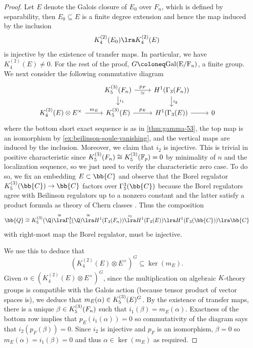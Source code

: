 \documentclass[a4paper]{amsart}
\begin{document}
\begin{proof}
Let $E$ denote the Galois closure of $E_0$ over $F_n$, which is defined by separability, then $E_0 \subseteq E$ is a finite degree extension and hence the map induced by the inclusion
\[K_4^{(2)}(E_0) \lra K_4^{(2)}(E)\]
is injective by the existence of transfer maps. In particular, we have $K_4^{(2)}(E) \neq 0$. For the rest of the proof, $G \coloneq \rm{Gal}(E/F_n)$, a finite group. We next consider the following commutative diagram 
    \[\begin{tikzcd}  & K_5^{(3)}(F_n) \dar{i_1} \rar{p_F}[swap]{\simeq} & H^1(\Gamma_3(F_n))\dar{i_2}\\[-5pt]  K_4^{(2)}(E) \otimes E^\times \rar{m_E} & K_5^{(3)}(E) \rar{p_E} & H^1(\Gamma_3(E)) \rar & 0\end{tikzcd}\]
    where the bottom short exact sequence is as in \cref{thm:gamma-53}, the top map is an isomorphism by \cref{ex:beilinson-soule-vanishing}, and the vertical maps are induced by the inclusion. Moreover, we claim that $i_2$ is injective. This is trivial in positive characteristic since $\smash{K_5^{(3)}(F_n)} \cong \smash{K_5^{(3)}(\mathbb{F}_p)}=0$ by minimality of $n$ and the localization sequence, so we just need to verify the characteristic zero case. To do so, we fix an embedding $E \subset \bb{C}$ and observe that the Borel regulator $\smash{K_5^{(3)}(\bb{C})} \to \bb{C}$ factors over $\Gamma_5^3(\bb{C})$ because the Borel regulators agree with Beilinson regulators up to a nonzero constant and the latter satisfy a product formula as  theory of Chern classes \cite[V.11]{Weibel}. Thus the composition
    \[\bb{Q} \cong K_5^{(3)}(\Q) \overset{\cong}\lra \Gamma_5^3(\Q) \overset{\cong}\lra H^1(\Gamma_3(F_n)) \overset{i_2}\lra H^1(\Gamma_3(E)) \lra H^1(\Gamma_3(\bb{C})) \lra \bb{C}\]
    with right-most map the Borel regulator, must be injective.

We use this to deduce that 
\[(K_4^{(2)}(E) \otimes E^\times)^G \subseteq \ker(m_E).\]
Given $\alpha \in (K_4^{(2)}(E) \otimes E^\times)^G$, since the multiplication on algebraic $K$-theory groups is compatible with the Galois action (because tensor product of vector spaces is), we deduce that $m_E(\alpha) \in \smash{K_5^{(3)}(E)^G}$. By the existence of transfer maps, there is a unique $\beta \in \smash{K_5^{(3)}(F_n)}$ such that $i_1(\beta)=m_E(\alpha)$.  Exactness of the bottom row implies that $p_E(i_1(\alpha))=0$ so commutativity of the diagram says that $i_2(p_F(\beta))=0$. Since $i_2$ is injective and $p_F$ is an isomorphism, $\beta=0$ so $m_E(\alpha)=i_1(\beta)=0$ and thus $\alpha \in \ker(m_E)$ as required.


\end{proof}
\end{document}
